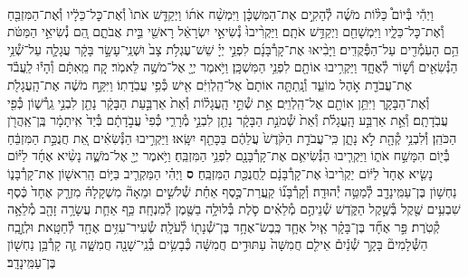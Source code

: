 \documentclass[twoside, openany, parskip=half, 11pt]{book}
\begin{document}
\begin{footnotesize}
\begin{multicols}{2}
\\
וַיְהִ֡י בְּ֯יוֹם֩ כַּלּ֨וֹת מֹשֶׁ֜ה לְ֯הָקִ֣ים אֶת־הַמִּשְׁכָּ֗ן וַיִּמְשַׁ֨ח אֹת֜וֹ וַיְקַדֵּ֤שׁ אֹתוֹ֙ וְ֯אֶת־כׇּל־כֵּלָ֔יו וְ֯אֶת־הַמִּזְבֵּ֖חַ וְ֯אֶת־כׇּל־כֵּלָ֑יו וַיִּמְשָׁחֵ֖ם וַיְקַדֵּ֥שׁ אֹתָֽם׃ וַיַּקְרִ֨יבוּ֙ נְ֯שִׂיאֵ֣י יִשְׂרָאֵ֔ל רָאשֵׁ֖י בֵּ֣ית אֲבֹתָ֑ם הֵ֚ם נְ֯שִׂיאֵ֣י הַמַּטֹּ֔ת הֵ֥ם הָעֹֽמְ֯דִ֖ים עַל־הַפְּ֯קֻדִֽים׃ וַיָּבִ֨יאוּ אֶת־קָרְ֯בָּנָ֜ם לִפְנֵ֣י יְיָ֗ שֵׁשׁ־עֶגְלֹ֥ת צָב֙ וּשְׁנֵֽי־עָשָׂ֣ר בָּקָ֔ר עֲגָלָ֛ה עַל־שְׁ֯נֵ֥י הַנְּ֯שִׂאִ֖ים וְ֯שׁ֣וֹר לְ֯אֶחָ֑ד וַיַּקְרִ֥יבוּ אוֹתָ֖ם לִפְנֵ֥י הַמִּשְׁכָּֽן׃ 
וַיֹּ֥אמֶר יְיָ֖ אֶל־מֹשֶׁ֥ה לֵּאמֹֽר׃ קַ֚ח מֵֽאִתָּ֔ם וְ֯הָי֕וּ לַֽעֲבֹ֕ד אֶת־עֲבֹדַ֖ת אֹ֣הֶל מוֹעֵ֑ד וְ֯נָֽתַתָּ֤ה אוֹתָם֙ אֶל־הַֽלְוִיִּ֔ם אִ֖ישׁ כְּ֯פִ֥י עֲבֹֽדָתֽוֹ׃ וַיִּקַּ֣ח מֹשֶׁ֔ה אֶת־הָֽעֲגָלֹ֖ת וְ֯אֶת־הַבָּקָ֑ר וַיִּתֵּ֥ן אוֹתָ֖ם אֶל־הַֽלְוִיִּֽם׃ אֵ֣ת שְׁ֯תֵּ֣י הָֽעֲגָל֗וֹת וְ֯אֵת֙ אַרְבַּ֣עַת הַבָּקָ֔ר נָתַ֖ן לִבְנֵ֣י גֵֽרְ֯שׁ֑וֹן כְּ֯פִ֖י עֲבֹֽדָתָֽם׃ וְ֯אֵ֣ת אַרְבַּ֣ע הָֽעֲגָלֹ֗ת וְ֯אֵת֙ שְׁ֯מֹנַ֣ת הַבָּקָ֔ר נָתַ֖ן לִבְנֵ֣י מְ֯רָרִ֑י כְּ֯פִי֙ עֲבֹ֣דָתָ֔ם בְּ֯יַד֙ אִֽיתָמָ֔ר בֶּֽן־אַֽהֲרֹ֖ן הַכֹּהֵֽן׃ וְ֯לִבְנֵ֥י קְ֯הָ֖ת לֹ֣א נָתָ֑ן כִּֽי־עֲבֹדַ֤ת הַקֹּ֨דֶשׁ֙ עֲלֵהֶ֔ם בַּכָּתֵ֖ף יִשָּֽׂאוּ׃ וַיַּקְרִ֣יבוּ הַנְּ֯שִׂאִ֗ים אֵ֚ת חֲנֻכַּ֣ת הַמִּזְבֵּ֔חַ בְּ֯י֖וֹם הִמָּשַׁ֣ח אֹת֑וֹ וַיַּקְרִ֧יבוּ הַנְּ֯שִׂיאִ֛ם אֶת־קָרְ֯בָּנָ֖ם לִפְנֵ֥י הַמִּזְבֵּֽחַ׃ וַיֹּ֥אמֶר יְיָ֖ אֶל־מֹשֶׁ֑ה נָשִׂ֨יא אֶחָ֜ד לַיּ֗וֹם נָשִׂ֤יא אֶחָד֙ לַיּ֔וֹם יַקְרִ֨יבוּ֙ אֶת־קָרְ֯בָּנָ֔ם לַֽחֲנֻכַּ֖ת הַמִּזְבֵּֽחַ׃ \textbf{ס}  
וַיְהִ֗י הַמַּקְרִ֛יב בַּיּ֥וֹם הָֽרִאשׁ֖וֹן אֶת־קָרְ֯בָּנ֑וֹ נַחְשׁ֥וֹן בֶּן־עַמִּֽינָדָ֖ב לְ֯מַטֵּ֥ה יְ֯הוּדָֽה׃ וְ֯קָרְ֯בָּנ֞וֹ קַֽעֲרַת־כֶּ֣סֶף אַחַ֗ת שְׁ֯לֹשִׁ֣ים וּמֵאָה֘ מִשְׁקָלָהּ֒ מִזְרָ֤ק אֶחָד֙ כֶּ֔סֶף שִׁבְעִ֥ים שֶׁ֖קֶל בְּ֯שֶׁ֣קֶל הַקֹּ֑דֶשׁ שְׁ֯נֵיהֶ֣ם מְ֯לֵאִ֗ים סֹ֛לֶת בְּ֯לוּלָ֥ה בַשֶּׁ֖מֶן לְ֯מִנְחָֽה׃ כַּ֥ף אַחַ֛ת עֲשָׂרָ֥ה זָהָ֖ב מְ֯לֵאָ֥ה קְ֯טֹֽרֶת׃
פַּ֣ר אֶחָ֞ד בֶּן־בָּקָ֗ר אַ֧יִל אֶחָ֛ד כֶּֽבֶשׂ־אֶחָ֥ד בֶּן־שְׁ֯נָת֖וֹ לְ֯עֹלָֽה׃ שְׂ֯עִיר־עִזִּ֥ים אֶחָ֖ד לְ֯חַטָּֽאת׃ וּלְזֶ֣בַֽח הַשְּׁ֯לָמִים֘ בָּקָ֣ר שְׁ֯נַ֒יִם֒ אֵילִ֤ם חֲמִשָּׁה֙ עַתּוּדִ֣ים חֲמִשָּׁ֔ה כְּ֯בָשִׂ֥ים בְּ֯נֵֽי־שָׁנָ֖ה חֲמִשָּׁ֑ה זֶ֛ה קָרְ֯בַּ֥ן נַחְשׁ֖וֹן בֶּן־עַמִּֽינָדָֽב׃



\end{multicols}
\end{footnotesize}
\end{document}
